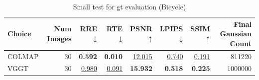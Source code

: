 \begin{table}[H]
\caption{Small test for gt evaluation (Bicycle)}
\label{tab:06_gt_bicycle}
\begin{tabular}{lrrrrrrr}
\toprule
Choice & Num Images & RRE ↓ & RTE ↓ & PSNR ↑ & LPIPS ↓ & SSIM ↑ & Final Gaussian Count \\
\midrule
COLMAP & 30 & \textbf{0.592} & \textbf{0.010} & \underline{12.015} & \underline{0.740} & \underline{0.191} & 811220 \\
VGGT & 30 & \underline{0.980} & \underline{0.091} & \textbf{15.932} & \textbf{0.518} & \textbf{0.225} & 1000000 \\
\bottomrule
\end{tabular}
\end{table}
